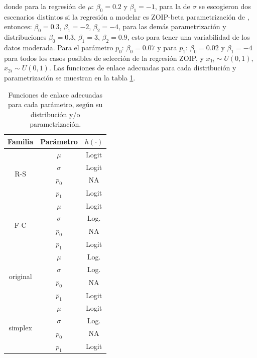 donde para la regresi\'{o}n de $\mu$: $\beta_0=0.2$ y $\beta_1=-1$, para la de $\sigma$ se escogieron dos escenarios distintos si la regresi\'{o}n a modelar es ZOIP-beta parametrizaci\'{o}n de \cite{Stasinopoulos2}, entonces: $\beta_0=0.3$, $\beta_1=-2$, $\beta_2=-4$, para las dem\'{a}s parametrizaci\'{o}n y distribuciones $\beta_0=0.3$, $\beta_1=3$, $\beta_2=0.9$, esto para tener una variabilidad de los datos moderada. Para el par\'{a}metro $p_0$: $\beta_0=0.07$ y para $p_1$: $\beta_0=0.02$ y $\beta_1=-4$ para todos los casos posibles de selecci\'{o}n de la regresi\'{o}n ZOIP, y $x_{1i} \sim U(0,1)$, $x_{2i} \sim U(0,1)$. Las funciones de enlace adecuadas para cada distribuci\'{o}n y parametrizaci\'{o}n se muestran en la tabla \ref{T_F_enlace}.\\

\begin{table}[!hbt]
{\scriptsize
\begin{center}
\begin{tabular}{|c|c|c|}\hline
Familia & Par\'{a}metro & $h(\cdot)$ \\ \hline
\multirow{4}{*}{R-S} & $\mu$ & Logit \\
 & $\sigma$ & Logit \\
 & $p_0$ & NA \\
 & $p_1$ & Logit \\ \hline

\multirow{4}{*}{F-C} & $\mu$ & Logit \\
 & $\sigma$ & Log. \\
 & $p_0$ & NA \\
 & $p_1$ & Logit \\ \hline

\multirow{4}{*}{original} & $\mu$ & Log. \\
 & $\sigma$ & Log. \\
 & $p_0$ & NA \\
 & $p_1$ & Logit \\ \hline

\multirow{4}{*}{simplex} & $\mu$ & Logit \\
 & $\sigma$ & Log. \\
 & $p_0$ & NA \\
 & $p_1$ & Logit \\ \hline

\end{tabular}
\caption{Funciones de enlace adecuadas para cada par\'{a}metro, seg\'{u}n su distribuci\'{o}n y/o parametrizaci\'{o}n.}
\label{T_F_enlace}
\end{center}
}
\end{table}

